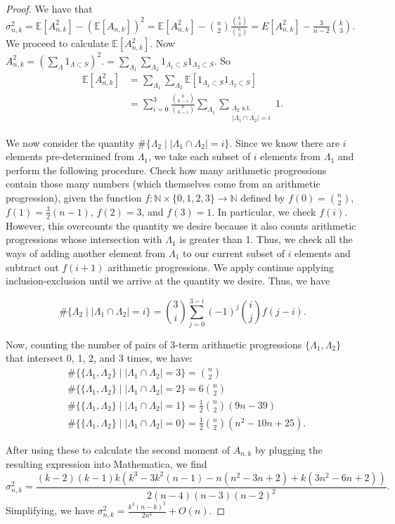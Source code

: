 \documentclass[12pt]{article} %
\newcommand{\abs}[1]{\left\lvert#1\right\rvert}
\newcommand{\E}{\mathbb{E}}
\newcommand{\bbn}{\mathbb{N}}
\theoremstyle{definition}
\theoremstyle{definition}
\begin{document}
\begin{proof}
We have that $\sigma_{n,k}^2 = \E[A_{n,k}^2] - (\E[A_{n,k}])^2 = \E[A_{n,k}^2] - {n\choose 2}\frac{{k\choose 3}}{{n\choose 3}} = E[A_{n,k}^2] - \frac{3}{n-2} {k\choose 3}.$ We proceed to calculate $\E[A_{n,k}^2]$. Now $A_{n,k}^2 = (\sum_{\Lambda} 1_{\Lambda \subset S})^2. = \sum_{\Lambda_1}\sum_{\Lambda_2} 1_{\Lambda_1 \subset S} 1_{\Lambda_2 \subset S}.$ So 
\begin{align*}
\E[A_{n,k}^2] &= \sum_{\Lambda_1}\sum_{\Lambda_2} \E[1_{\Lambda_1 \subset S} 1_{\Lambda_2 \subset S}] \\
&= \sum_{i = 0}^3 \frac{{k\choose{6-i}}}{{n\choose{6-i}}} \sum_{\Lambda_1}\sum_{\substack{\Lambda_2 \textrm{ s.t. } \\ \abs{\Lambda_1 \cap \Lambda_2} = i}} 1.
\end{align*}

We now consider the quantity $\#\{\Lambda_2 \mid \abs{\Lambda_1 \cap \Lambda_2} = i\}$. Since we know there are $i$ elements pre-determined from $\Lambda_1$, we take each subset of $i$ elements from $\Lambda_1$ and perform the following procedure. Check how many arithmetic progressions contain those many numbers (which themselves come from an arithmetic progression), given the function $f: \bbn \times \{0, 1, 2, 3\} \to \bbn$ defined by $f(0) = \binom{n}{2}$, $f(1) = \frac{3}{2}(n-1)$, $f(2) = 3$, and $f(3) = 1$. In particular, we check $f(i)$. However, this overcounts the quantity we desire because it also counts arithmetic progressions whose intersection with $\Lambda_1$ is greater than 1. Thus, we check all the ways of adding another element from $\Lambda_1$ to our current subset of $i$ elements and subtract out $f(i+1)$ arithmetic progressions. We apply continue applying inclusion-exclusion until we arrive at the quantity we desire. Thus, we have

$$ \#\{\Lambda_2 \mid \abs{\Lambda_1 \cap \Lambda_2} = i\} = \binom{3}{i}\sum_{j=0}^{3-i} {(-1)^{j}\binom{i}{j}f(j-i)}. $$

Now, counting the number of pairs of 3-term arithmetic progressions $\{\Lambda_1, \Lambda_2\}$ that intersect 0, 1, 2, and 3 times, we have:
\begin{align*}
&\#\{\{\Lambda_1, \Lambda_2\} \mid \abs{\Lambda_1 \cap \Lambda_2} = 3\} = {n\choose 2} \\ 
&\#\{\{\Lambda_1, \Lambda_2\} \mid \abs{\Lambda_1 \cap \Lambda_2} = 2\} = 6{n\choose 2} \\
&\#\{\{\Lambda_1, \Lambda_2\} \mid \abs{\Lambda_1 \cap \Lambda_2} = 1\} = \frac{1}{2}{n\choose2}(9n-39) \\
&\#\{\{\Lambda_1, \Lambda_2\} \mid \abs{\Lambda_1 \cap \Lambda_2} = 0\} 
= \frac{1}{2}{n\choose 2}(n^2-10n+25).
\end{align*} 

After using these to calculate the second moment of $A_{n,k}$ by plugging the resulting expression into Mathematica, we find
\[ \sigma_{n,k}^2 = \frac{(k-2)(k-1)k(k^3-3k^2(n-1) - n(n^2-3n+2)+k(3n^2-6n+2))}{2(n-4)(n-3)(n-2)^2}. \]
Simplifying, we have $\sigma_{n,k}^2 = \frac{k^3(n-k)^3}{2n^4} + O(n)$.
\end{proof}
\end{document}
